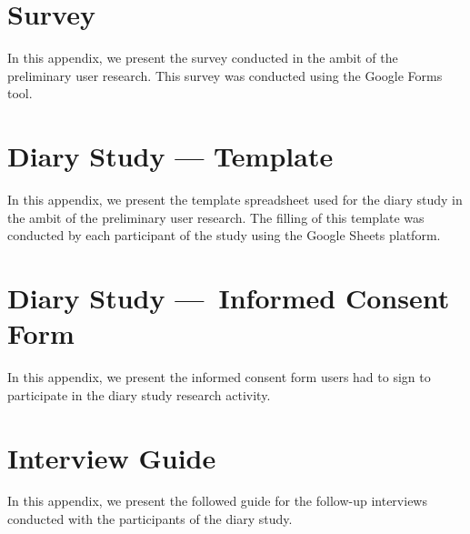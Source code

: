 \chapter{Survey}
\label{chapter:appendixA}

In this appendix, we present the survey conducted in the ambit of the preliminary user research. This survey was conducted using the Google Forms tool.




\chapter{Diary Study — Template}
\label{chapter:appendixB}

In this appendix, we present the template spreadsheet used for the diary study in the ambit of the preliminary user research. The filling of this template was conducted by each participant of the study using the Google Sheets platform.



\chapter{Diary Study — Informed Consent Form}
\label{chapter:appendixC}

In this appendix, we present the informed consent form users had to sign to participate in the diary study research activity.



\chapter{Interview Guide}
\label{chapter:appendixD}

In this appendix, we present the followed guide for the follow-up interviews conducted with the participants of the diary study.



